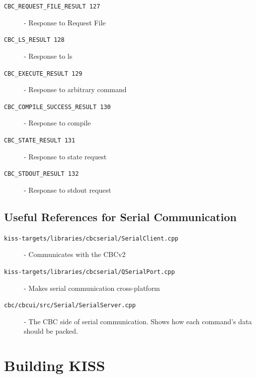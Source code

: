 \documentclass[7pt,letterpaper]{article}
\newcommand{\code}[1]{\texttt{#1}}
\begin{document}
\begin{description}
	\item[\code{CBC\_REQUEST\_FILE\_RESULT 	127}] - Response to Request File
	\item[\code{CBC\_LS\_RESULT 			128}] - Response to ls
	\item[\code{CBC\_EXECUTE\_RESULT 		129}] - Response to arbitrary command
	\item[\code{CBC\_COMPILE\_SUCCESS\_RESULT 	130}] - Response to compile
	\item[\code{CBC\_STATE\_RESULT 		131}] - Response to state request
	\item[\code{CBC\_STDOUT\_RESULT 		132}] - Response to stdout request
	\end{description}
	\singlespacing
	
	\subsection{Useful References for Serial Communication}
	\begin{description}
	\item[\code{kiss-targets/libraries/cbcserial/SerialClient.cpp}] - Communicates with the CBCv2
	\item[\code{kiss-targets/libraries/cbcserial/QSerialPort.cpp}] - Makes serial communication cross-platform
	\item[\code{cbc/cbcui/src/Serial/SerialServer.cpp}] - The CBC side of serial communication. Shows how each command's data should be packed.
	\end{description}
	\singlespacing
	

	\section{Building KISS}
	
\end{document}
